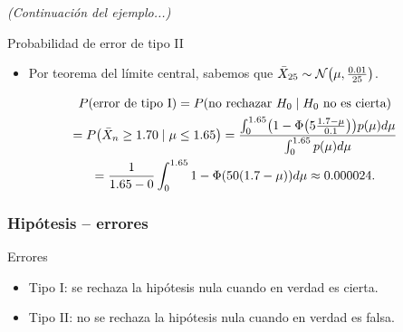 \documentclass[table]{beamer}
\begin{document}
\begin{frame}
\textit{(Continuación del ejemplo...)}
    \begin{block}{Probabilidad de error de tipo II}
        \begin{itemize}
            \item Por teorema del límite central, sabemos que $\bar{X}_{25} \sim \normal{\mu}{\frac{0.01}{25}}$.
        \end{itemize}
        \begin{multline*}
            \prob{\text{error de tipo I}}
            = \prob{\text{no rechazar } H_{0} \mid H_{0} \text{ no es cierta}}
            \\
            = \prob{\bar{X}_{n} \geq 1.70 \mid \mu \leq 1.65}
            = \frac{\int_{0}^{1.65} \parens{1 - \phifunc{5 \frac{1.7 - \mu}{0.1}}} \pdf{\mu} d \mu}{\int_{0}^{1.65} \pdf{\mu} d \mu}
            \\
            = \frac{1}{1.65 - 0} \int_{0}^{1.65} 1 - \phifunc{50 \parens{1.7 - \mu}} d \mu \approx 0.000024 .
        \end{multline*}
    \end{block}
\end{frame}

\begin{frame}
    \frametitle{Hipótesis -- errores}
    \begin{block}{Errores}
        \begin{itemize}
            \item Tipo I: se rechaza la hipótesis nula cuando en verdad es cierta.
            \item Tipo II: no se rechaza la hipótesis nula cuando en verdad es falsa.
        \end{itemize}
    \end{block}

\end{frame}
\end{document}
